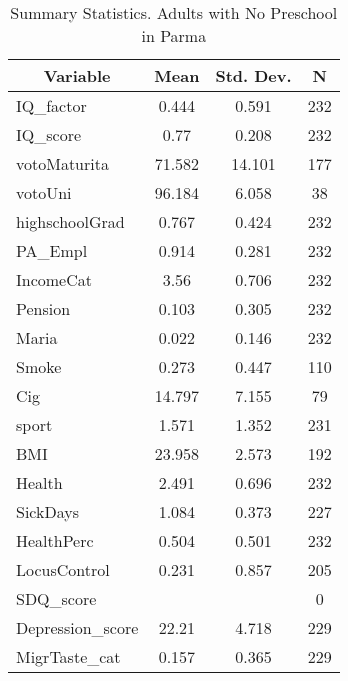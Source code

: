 
\begin{table}[htbp]\centering \caption{Summary Statistics. Adults with No Preschool in Parma \label{bothAdultmaternaNoneParma}}
\begin{tabular}{l c c  c}\hline\hline
\multicolumn{1}{c}{\textbf{Variable}} & \textbf{Mean}
 & \textbf{Std. Dev.} & \textbf{N}\\ \hline
IQ\_factor & 0.444 & 0.591  & 232\\
IQ\_score & 0.77 & 0.208  & 232\\
votoMaturita & 71.582 & 14.101  & 177\\
votoUni & 96.184 & 6.058  & 38\\
highschoolGrad & 0.767 & 0.424  & 232\\
PA\_Empl & 0.914 & 0.281  & 232\\
IncomeCat & 3.56 & 0.706  & 232\\
Pension & 0.103 & 0.305  & 232\\
Maria & 0.022 & 0.146  & 232\\
Smoke & 0.273 & 0.447  & 110\\
Cig & 14.797 & 7.155  & 79\\
sport & 1.571 & 1.352  & 231\\
BMI & 23.958 & 2.573  & 192\\
Health & 2.491 & 0.696  & 232\\
SickDays & 1.084 & 0.373  & 227\\
HealthPerc & 0.504 & 0.501  & 232\\
LocusControl & 0.231 & 0.857  & 205\\
SDQ\_score &  &   & 0\\
Depression\_score & 22.21 & 4.718  & 229\\
MigrTaste\_cat & 0.157 & 0.365  & 229\\
\hline\end{tabular}
\end{table}
